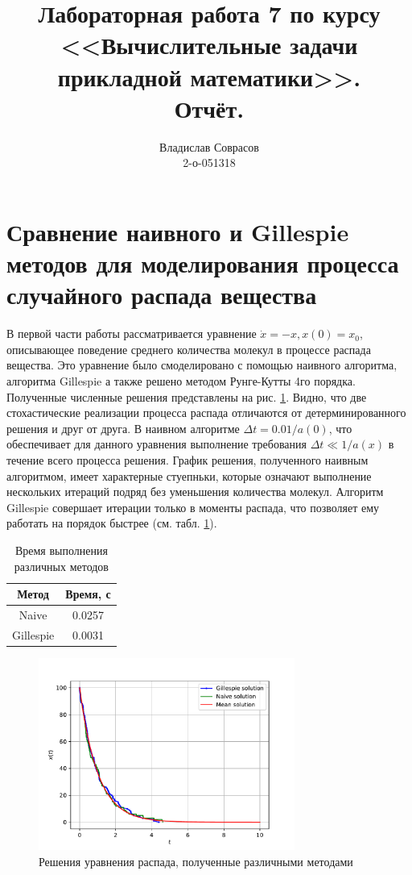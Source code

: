 \documentclass[a4paper]{article}
\begin{document}
\title{Лабораторная работа 7 по курсу <<Вычислительные задачи прикладной математики>>. \\Отчёт.}
\author{Владислав Соврасов\\ 2-о-051318}
\date{}
\maketitle

\section{Сравнение наивного и Gillespie методов для моделирования процесса случайного распада вещества}

В первой части работы рассматривается уравнение \(\dot x = -x, x(0)=x_0\), описывающее
поведение среднего количества молекул в процессе распада вещества. Это уравнение было
смоделировано с помощью наивного алгоритма, алгоритма Gillespie а также решено
методом Рунге-Кутты 4го порядка. Полученные численные решения представлены на
рис. \ref{fig:1d_decay}. Видно, что две стохастические реализации процесса распада отличаются
от детерминированного решения и друг от друга. В наивном алгоритме \(\Delta t=0.01/a(0)\), что
обеспечивает для данного уравнения выполнение требования \(\Delta t \ll 1/a(x)\) в течение всего процесса решения.
График решения, полученного наивным алгоритмом, имеет характерные стуепньки, которые означают выполнение
нескольких итераций подряд без уменьшения количества молекул. Алгоритм Gillespie совершает итерации
только в моменты распада, что позволяет ему работать на порядок быстрее (см. табл. \ref{tab:time}).

\begin{table}[h!]
  \centering
  \begin{tabular}{ c|c }
     Метод & Время, с  \\
     \hline
     Naive & 0.0257  \\
     Gillespie & 0.0031
  \end{tabular}
\caption{Время выполнения различных методов}
\label{tab:time}
\end{table}


\begin{figure}[H]
  \center
  \includegraphics[width=0.75\textwidth]{../pictures/lab7_eq_1.pdf}
  \caption{Решения уравнения распада, полученные различными методами}
  \label{fig:1d_decay}
\end{figure}
\end{document}
